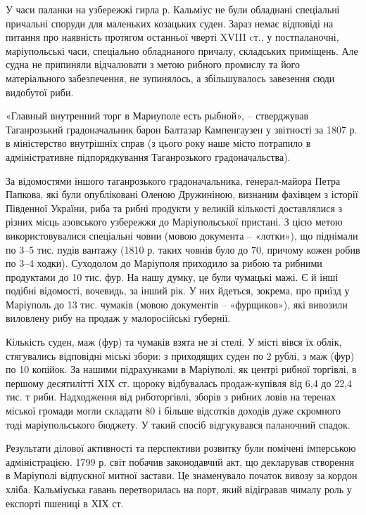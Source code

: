 У часи паланки на узбережжі гирла р. Кальміус не були обладнані спеціальні
причальні споруди для маленьких козацьких суден. Зараз немає відповіді на
питання про наявність протягом останньої чверті XVIII cт., у постпаланочні,
маріупольські часи, спеціально обладнаного причалу, складських приміщень. Але
судна  не припиняли відчалювати з метою рибного промислу та його матеріального
забезпечення, не зупинялось, а збільшувалось завезення сюди видобутої риби.  

«Главный внутренний торг в Мариуполе есть рыбной», – стверджував Таганрозький
градоначальник барон Балтазар Кампенгаузен у звітності за 1807 р. в
міністерство внутрішніх справ (з цього року наше місто потрапило в
адміністративне підпорядкування Таганрозького градоначальства).

За відомостями іншого таганрозького градоначальника, генерал-майора Петра
Папкова, які були опубліковані Оленою Дружиніною, визнаним фахівцем з історії
Південної України, риба та рибні продукти у великій кількості доставлялися з
різних місць азовського узбережжя до Маріупольської пристані. З цією метою
використовувалися спеціальні човни (мовою документа – «лотки»), що піднімали по
3–5 тис. пудів вантажу (1810 р. таких човнів було до 70, причому кожен робив по
3–4 ходки). Суходолом до Маріуполя приходило за рибою та рибними продуктами до
10 тис. фур. На нашу думку, це були чумацькі мажі. Є й інші  подібні відомості,
вочевидь, за інший рік. У них йдеться, зокрема, про приїзд у Маріуполь до 13
тис. чумаків (мовою документів – «фурщиков»), які вивозили виловлену рибу на
продаж у малоросійські губернії.

Кількість суден, маж (фур) та чумаків взята не зі стелі. У місті вівся їх
облік, стягувались відповідні міські збори: з приходящих суден по 2 рублі, з
маж (фур) по 10 копійок. За нашими підрахунками в Маріуполі, як центрі рибної
торгівлі, в першому десятилітті ХІХ ст. щороку відбувалась продаж-купівля  від
6,4 до 22,4 тис. т риби. Надходження від риботоргівлі, зборів з рибних ловів на
теренах міської громади могли складати 80 і більше відсотків доходів дуже
скромного тоді маріупольського бюджету. У такий спосіб відгукувався паланочний
спадок.

Результати ділової активності та перспективи розвитку були помічені імперською
адміністрацією. 1799 р. світ  побачив законодавчий акт, що декларував створення
в Маріуполі відпускної митної застави. Це знаменувало початок вивозу за кордон
хліба. Кальміуська гавань перетворилась на порт, який відігравав чималу роль у
експорті пшениці в ХІХ ст. 

